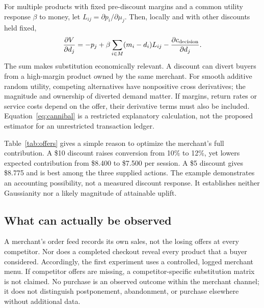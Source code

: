 \documentclass[11pt]{article}
\theoremstyle{remark}\newtheorem{example}{Example}
\begin{document}
For multiple products with fixed pre-discount margins and a common utility
response $\beta$ to money, let $L_{ij}=\partial p_i/\partial\mu_j$. Then,
locally and with other discounts held fixed,
\begin{equation}\label{eq:cannibal}
 \frac{\partial V}{\partial d_j}
 =-p_j+\beta\sum_{i\in M}(m_i-d_i)L_{ij}
       -\frac{\partial c_{\rm decision}}{\partial d_j}.
\end{equation}
The sum makes substitution economically relevant. A discount can divert buyers
from a high-margin product owned by the same merchant. For smooth additive
random utility, competing alternatives have nonpositive cross derivatives;
the magnitude and ownership of diverted demand matter. If margins, return
rates or service costs depend on the offer, their derivative terms must also
be included. Equation~\eqref{eq:cannibal} is a restricted explanatory calculation,
not the proposed estimator for an unrestricted transaction ledger.

\begin{table}[htbp]\centering\small

\caption{Illustrative discount cannibalization. A contributes \$60 before its
discount and B contributes \$100. Probabilities are supplied scenario inputs,
not data or a fitted Gaussian demand system. Contribution is per eligible
session, before any common decision charge.}\label{tab:offers}
\end{table}

Table~\ref{tab:offers} gives a simple reason to optimize the merchant's full
contribution. A \$10 discount raises conversion from 10\% to 12\%, yet lowers
expected contribution from \$8.400 to \$7.500 per session. A \$5 discount gives
\$8.775 and is best among the three supplied actions. The example demonstrates
an accounting possibility, not a measured discount response. It establishes
neither Gaussianity nor a likely magnitude of attainable uplift.

\subsection{What can actually be observed}
A merchant's order feed records its own sales, not the losing offers at every
competitor. Nor does a completed checkout reveal every product that a buyer
considered. Accordingly, the first experiment uses a controlled, logged
merchant menu. If competitor offers are missing, a competitor-specific
substitution matrix is not claimed. No purchase is an observed outcome within
the merchant channel; it does not distinguish postponement, abandonment, or
purchase elsewhere without additional data.
\end{document}
